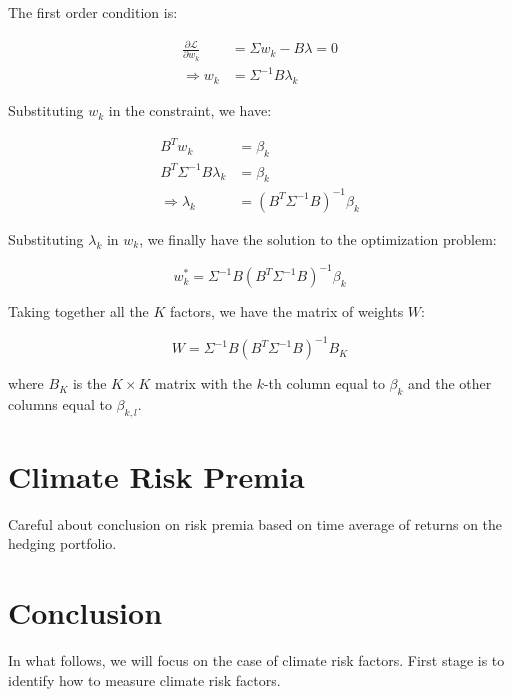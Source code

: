 The first order condition is:

\begin{equation}
    \begin{aligned}
        \frac{\partial \mathcal{L}}{\partial w_k} &= \Sigma w_k - B \lambda = 0 \\
        \Rightarrow w_k &= \Sigma^{-1} B \lambda_k
    \end{aligned}
\end{equation}

Substituting $w_k$ in the constraint, we have:

\begin{equation}
    \begin{aligned}
        B^T w_k &= \beta_k \\
        B^T \Sigma^{-1} B \lambda_k &= \beta_k \\
        \Rightarrow \lambda_k &= (B^T \Sigma^{-1} B)^{-1} \beta_k
    \end{aligned}
\end{equation}

Substituting $\lambda_k$ in $w_k$, we finally have 
the solution to the optimization problem:

\begin{equation}
    w_k^* = \Sigma^{-1} B (B^T \Sigma^{-1} B)^{-1} \beta_k
\end{equation}

Taking together all the $K$ factors, we have the matrix of weights $W$:

\begin{equation}
    W = \Sigma^{-1} B (B^T \Sigma^{-1} B)^{-1} B_K
\end{equation}

where $B_K$ is the $K \times K$ matrix with the $k$-th column equal to $\beta_k$ and the other columns equal to $\beta_{k,l}$.

\section{Climate Risk Premia}

Careful about conclusion on risk premia based 
on time average of returns on the hedging portfolio.

\section{Conclusion}

In what follows, we will focus 
on the case of climate risk factors.
First stage is to identify how to measure 
climate risk factors.
